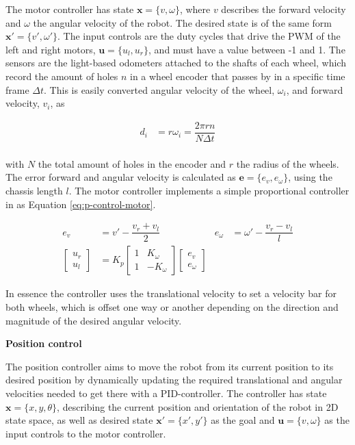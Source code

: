 The motor controller has state $\mathbf{x} = \{v, \omega\}$, where $v$ describes the forward velocity and $\omega$ the angular velocity of the robot. The desired state is of the same form $\mathbf{x}' = \{v', \omega'\}$. The input controls are the duty cycles that drive the PWM of the left and right motors, $\mathbf{u} = \{u_l, u_r\}$, and must have a value between -1 and 1. The sensors are the light-based odometers attached to the shafts of each wheel, which record the amount of holes $n$ in a wheel encoder that passes by in a specific time frame $\Delta t$. This is easily converted angular velocity of the wheel, $\omega_i$, and forward velocity, $v_i$, as

\begin{align}
    d_i &= r\omega_i = \dfrac{2 \pi r n}{N \Delta t} \\
\end{align}

with $N$ the total amount of holes in the encoder and $r$ the radius of the wheels. The error forward and angular velocity is calculated as $\mathbf{e}=\{e_v, e_\omega\}$, using the chassis length $l$. The motor controller implements a simple proportional controller in as Equation \ref{eq:p-control-motor}.

\begin{align}
	e_v &= v' - \dfrac{v_r + v_l}{2} & e_\omega &= \omega' - \dfrac{v_r - v_l}{l} \\
    \begin{bmatrix} u_r \\ u_l \end{bmatrix} &= K_p \begin{bmatrix}
        1 & K_\omega \\
        1 & -K_\omega
    \end{bmatrix} \begin{bmatrix}
        e_v \\ e_\omega
    \end{bmatrix}
    \label{eq:p-control-motor}
\end{align}

In essence the controller uses the translational velocity to set a velocity bar for both wheels, which is offset one way or another depending on the direction and magnitude of the desired angular velocity.

\textbf{Position control}

The position controller aims to move the robot from its current position to its desired position by dynamically updating the required translational and angular velocities needed to get there with a PID-controller. The controller has state $\mathbf{x} = \{x, y, \theta\}$, describing the current position and orientation of the robot in 2D state space, as well as desired state $\mathbf{x}'=\{x', y'\}$ as the goal and $\mathbf{u} = \{v, \omega\}$ as the input controls to the motor controller.

